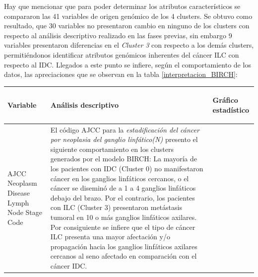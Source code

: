 Hay que mencionar que para poder determinar los atributos característicos se compararon las 41 variables de origen genómico de los 4 clusters. Se obtuvo como resultado, que 30 variables no presentaron cambio en ninguno de los clusters con respecto al análisis descriptivo realizado en las fases previas, sin embargo 9 variables presentaron diferencias en el \textit{Cluster 3} con respecto a los demás clusters, permitiéndonos identificar atributos genómicos inherentes del cáncer ILC con respecto al IDC. Llegados a este punto se infiere, según el comportamiento de los datos, las apreciaciones que se observan en la tabla \ref{interpretacion_BIRCH}:
\begin{table}[htb!]
	\footnotesize
	\begin{threeparttable}
		\begin{tabular}{p{2.5cm} p{7cm} p{6.5cm}} \toprule
			\begin{center}Variable\end{center}   	 
			&\begin{center}Análisis descriptivo\end{center}             
			&\begin{center}Gráfico estadístico\end{center}\\ \hline
			AJCC Neoplasm Disease Lymph Node Stage Code
			&  El código AJCC para la \textit{estadificación del cáncer por neoplasia del ganglio linfático(N)} presento el siguiente comportamiento en los clusters generados por el modelo BIRCH: La mayoría de los pacientes con IDC (Cluster 0) no manifestaron cáncer en los ganglios linfáticos cercanos, o el cáncer se diseminó de a 1 a 4 ganglios linfáticos debajo del brazo. Por el contrario, los pacientes con ILC (Cluster 3) presentaron metástasis tumoral en 10 o más ganglios linfáticos axilares. Por consiguiente se infiere que el tipo de cáncer ILC presenta una mayor afectación y/o propagación hacia los ganglios linfáticos axilares cercanos al seno afectado en comparación con el cáncer IDC.
			

\end{tabular}
\end{threeparttable}
\end{table}
